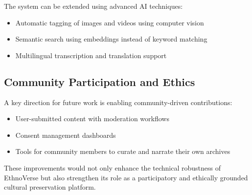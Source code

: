 The system can be extended using advanced AI techniques:
\begin{itemize}
    \item Automatic tagging of images and videos using computer vision
    \item Semantic search using embeddings instead of keyword matching
    \item Multilingual transcription and translation support
\end{itemize}

\subsection{Community Participation and Ethics}

A key direction for future work is enabling community-driven contributions:
\begin{itemize}
    \item User-submitted content with moderation workflows
    \item Consent management dashboards
    \item Tools for community members to curate and narrate their own archives
\end{itemize}

These improvements would not only enhance the technical robustness of EthnoVerse but also strengthen its role as a participatory and ethically grounded cultural preservation platform.